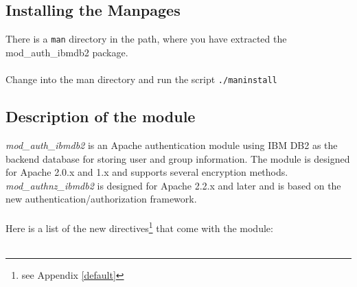 \documentclass[11pt,letterpaper]{article}
\begin{document}
\subsection{Installing the Manpages}
There is a {\tt man} directory in the path, where you have extracted the mod\_auth\_ibmdb2 package.\\ 
\\
Change into the man directory and run the script {\tt ./maninstall} 
\newpage

\subsection{Description of the module}
\emph{mod\_auth\_ibmdb2} is an Apache authentication module using IBM DB2 as the backend database for storing user and group information. The module is designed for Apache 2.0.x and 1.x and supports several encryption methods.\\
\emph{mod\_authnz\_ibmdb2} is designed for Apache 2.2.x and later and is based on the new authentication/authorization framework.\\
\\
Here is a list of the new directives\footnote{see Appendix \ref{default}} that come with the module:\\
\\
\small
\end{document}

